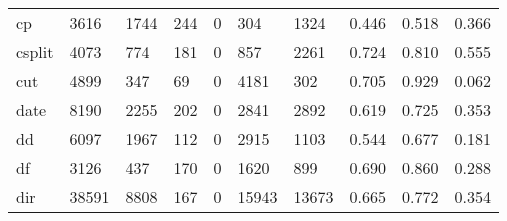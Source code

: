 \begin{longtable}{lp{2.0cm}p{2.0cm}p{2.0cm}p{2.0cm}p{2.0cm}p{2.0cm}p{2.0cm}p{2.0cm}p{2.0cm}}
cp        &                   3616 &                               1744 &                               244 &                                0 &                               304 &                            1324 &                                0.446 &                                  0.518 &                                0.366 \\
csplit    &                   4073 &                                774 &                               181 &                                0 &                               857 &                            2261 &                                0.724 &                                  0.810 &                                0.555 \\
cut       &                   4899 &                                347 &                                69 &                                0 &                              4181 &                             302 &                                0.705 &                                  0.929 &                                0.062 \\
date      &                   8190 &                               2255 &                               202 &                                0 &                              2841 &                            2892 &                                0.619 &                                  0.725 &                                0.353 \\
dd        &                   6097 &                               1967 &                               112 &                                0 &                              2915 &                            1103 &                                0.544 &                                  0.677 &                                0.181 \\
df        &                   3126 &                                437 &                               170 &                                0 &                              1620 &                             899 &                                0.690 &                                  0.860 &                                0.288 \\
dir       &                  38591 &                               8808 &                               167 &                                0 &                             15943 &                           13673 &                                0.665 &                                  0.772 &                                0.354 \\

\end{longtable}
